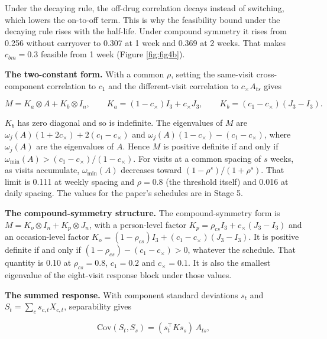 \documentclass[
  11pt,
]{article}
\begin{document}
Under the decaying rule, the off-drug correlation decays
instead of switching, which lowers the on-to-off term. This is why the
feasibility bound under the decaying rule rises with the
half-life. Under compound symmetry it rises from 0.256 without
carryover to 0.307 at 1 week and 0.369 at 2 weeks. That makes
\(c_{bm} = 0.3\) feasible from 1 week (Figure \ref{fig:fig4b}).

\textbf{The two-constant form.} With a common \(\rho\), setting the
same-visit cross-component correlation to \(c_1\) and the different-visit
correlation to \(c_\times A_{ts}\) gives

\[M = K_a \otimes A + K_b \otimes I_n, \qquad
K_a = (1 - c_\times)I_3 + c_\times J_3, \qquad
K_b = (c_1 - c_\times)(J_3 - I_3).\]

\(K_b\) has zero diagonal and so is indefinite. The eigenvalues of \(M\)
are \(\omega_j(A)(1 + 2c_\times) + 2(c_1 - c_\times)\) and
\(\omega_j(A)(1 - c_\times) - (c_1 - c_\times)\), where \(\omega_j(A)\) are
the eigenvalues of \(A\). Hence \(M\) is positive definite if and only if
\(\omega_{\min}(A) > (c_1 - c_\times)/(1 - c_\times)\). For visits at a
common spacing of \(s\) weeks, as visits accumulate,
\(\omega_{\min}(A)\) decreases toward \((1 - \rho^s)/(1 + \rho^s)\). That
limit is 0.111 at weekly spacing and \(\rho = 0.8\) (the threshold
itself) and 0.016 at daily spacing. The values for the paper's
schedules are in Stage 5.

\textbf{The compound-symmetry structure.} The compound-symmetry form is
\(M = K_o \otimes I_n + K_p \otimes J_n\), with a person-level factor
\(K_p = \rho_{cs} I_3 + c_\times(J_3 - I_3)\) and an occasion-level factor
\(K_o = (1 - \rho_{cs})I_3 + (c_1 - c_\times)(J_3 - I_3)\). It is positive
definite if and only if \((1 - \rho_{cs}) - (c_1 - c_\times) > 0\),
whatever the schedule. That quantity is 0.10 at \(\rho_{cs} = 0.8\),
\(c_1 = 0.2\) and \(c_\times = 0.1\). It is also the smallest eigenvalue
of the eight-visit response block under those values.

\textbf{The summed response.} With component standard deviations \(s_t\) and
\(S_t = \sum_c s_{c,t}X_{c,t}\), separability gives

\[\mathrm{Cov}(S_t, S_s) = (s_t^\top K s_s)\,A_{ts},\]
\end{document}
